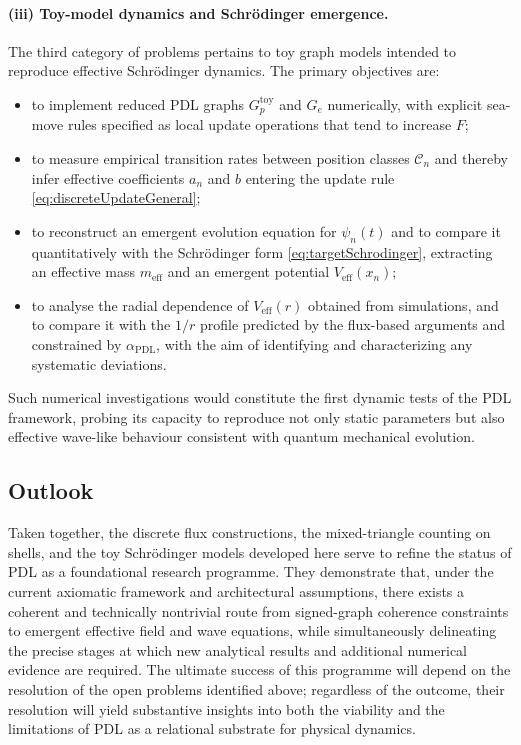 \documentclass[11pt,a4paper]{article}
\begin{document}
\paragraph{(iii) Toy-model dynamics and Schr\"odinger emergence.}
The third category of problems pertains to toy graph models intended to reproduce effective Schr\"odinger dynamics. The primary objectives are:
\begin{itemize}
  \item to implement reduced PDL graphs $G_{p}^{\mathrm{toy}}$ and $G_{e}$ numerically, with explicit sea-move rules specified as local update operations that tend to increase $F$;
  \item to measure empirical transition rates between position classes $\mathcal{C}_{n}$ and thereby infer effective coefficients $a_{n}$ and $b$ entering the update rule \eqref{eq:discreteUpdateGeneral};
  \item to reconstruct an emergent evolution equation for $\psi_{n}(t)$ and to compare it quantitatively with the Schr\"odinger form \eqref{eq:targetSchrodinger}, extracting an effective mass $m_{\mathrm{eff}}$ and an emergent potential $V_{\mathrm{eff}}(x_{n})$;
  \item to analyse the radial dependence of $V_{\mathrm{eff}}(r)$ obtained from simulations, and to compare it with the $1/r$ profile predicted by the flux-based arguments and constrained by $\alpha_{\mathrm{PDL}}$, with the aim of identifying and characterizing any systematic deviations.\cite{Laubscher2026SchrodingerSketch,Laubscher2026SchrodingerPDL}
\end{itemize}
Such numerical investigations would constitute the first dynamic tests of the PDL framework, probing its capacity to reproduce not only static parameters but also effective wave-like behaviour consistent with quantum mechanical evolution.

\subsection*{Outlook}

Taken together, the discrete flux constructions, the mixed-triangle counting on shells, and the toy Schr\"odinger models developed here serve to refine the status of PDL as a foundational research programme. 
They demonstrate that, under the current axiomatic framework and architectural assumptions, there exists a coherent and technically nontrivial route from signed-graph coherence constraints to emergent effective field and wave equations, while simultaneously delineating the precise stages at which new analytical results and additional numerical evidence are required.
The ultimate success of this programme will depend on the resolution of the open problems identified above; regardless of the outcome, their resolution will yield substantive insights into both the viability and the limitations of PDL as a relational substrate for physical dynamics.
\end{document}
